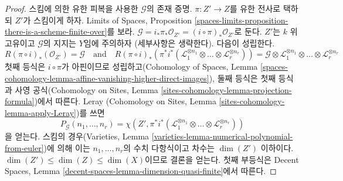 \begin{proof}
\medskip\noindent
스킴에 의한 유한 피복을 사용한 $\mathcal{G}$의 존재 증명.
$\pi : Z' \to Z$를 유한 전사로 택하되 $Z'$가 스킴이게 하자. Limits of
Spaces, Proposition
\ref{spaces-limits-proposition-there-is-a-scheme-finite-over}를 보라.
$\mathcal{G} = i_*\pi_*\mathcal{O}_{Z'} = (i \circ \pi)_*\mathcal{O}_{Z'}$로
둔다. $Z'$는 $k$ 위 고유이고 $\mathcal{G}$의 지지는 $Y$임에 주의하자
(세부사항은 생략한다).
다음이 성립한다.
$$
R(\pi \circ i)_*(\mathcal{O}_{Z'}) = \mathcal{G}
\quad\text{and}\quad
R(\pi \circ i)_*(\pi^*i^*(\mathcal{L}_1^{\otimes n_1} \otimes \ldots \otimes
\mathcal{L}_r^{\otimes n_r})
) = \mathcal{G} \otimes \mathcal{L}_1^{\otimes n_1} \otimes \ldots \otimes
\mathcal{L}_r^{\otimes n_r}
$$
첫째 등식은 $i \circ \pi$가 아핀이므로 성립하고(Cohomology of Spaces,
Lemma \ref{spaces-cohomology-lemma-affine-vanishing-higher-direct-images}),
둘째 등식은 첫째 등식과 사영 공식(Cohomology on Sites, Lemma
\ref{sites-cohomology-lemma-projection-formula})에서 따른다. Leray
(Cohomology on Sites, Lemma \ref{sites-cohomology-lemma-apply-Leray})를 쓰면
$$
P_\mathcal{G}(n_1, \ldots, n_r) =
\chi(Z', \pi^*i^*(\mathcal{L}_1^{\otimes n_1} \otimes \ldots \otimes
\mathcal{L}_r^{\otimes n_r}))
$$
을 얻는다. 스킴의 경우(Varieties, Lemma
\ref{varieties-lemma-numerical-polynomial-from-euler})에 의해 이는
$n_1, \ldots, n_r$의 수치 다항식이고 차수는 $\dim(Z')$ 이하이다.
$\dim(Z') \leq \dim(Z) \leq \dim(X)$이므로 결론을 얻는다. 첫째 부등식은
Decent Spaces, Lemma \ref{decent-spaces-lemma-dimension-quasi-finite}에서
따른다.


\end{proof}
